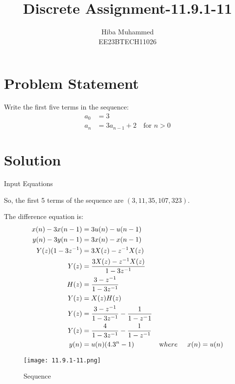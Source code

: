 \documentclass[12pt]{article}
\title{Discrete Assignment-11.9.1-11}
\author{Hiba Muhammed \\
        EE23BTECH11026}
\date{}
\begin{document}
\maketitle

\section*{Problem Statement}
Write the first five terms in the sequence:
\begin{align}
a_{0}  &= 3 \\
a_{n}  &= 3a_{n-1} + 2 \quad \text{for } n > 0
\end{align}

\section*{Solution}

\begin{table}[h]
  \centering
  
  \caption{Input Equations}
  \label{tab:input-equations}
\end{table}

So, the first 5 terms of the sequence are \( (3, 11, 35, 107, 323) \).

The difference equation is:
\begin{align}
x(n) - 3x(n-1) &= 3u(n) - u(n-1) \\
y(n) - 3y(n-1) &= 3x(n) - x(n-1)\\
Y(z)(1 - 3z^{-1}) &= 3X(z) - z^{-1}X(z) \\
Y(z) &= \frac{3X(z) - z^{-1}X(z)}{1 - 3z^{-1}}\\
H(z) &= \frac{3 - z^{-1}}{1 - 3z^{-1}}\\
Y(z) &=X(z)H(z) \\
Y(z)&=\frac{3 - z^{-1}}{1-3z^{-1}}-\frac{1}{1-z^-1}\\
Y(z)&=\frac{4}{1-3z^{-1}}-\frac{1}{1-z^{-1}}\\
y(n)&=u(n)(4.3^{n}-1) &\text where \hspace{0.5cm}x(n)=u(n)
\end{align}

\begin{figure}[h]
    \centering
    \texttt{[image: 11.9.1-11.png]}
    \caption{Sequence}
\end{figure}
\end{document}
